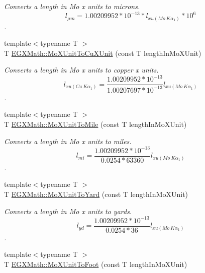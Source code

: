 \begin{DoxyCompactItemize}
\begin{DoxyCompactList}\small\item\em Converts a length in Mo x units to microns. \[ l_{\mu m}=1.00209952*10^{-13} * l_{xu(Mo\ K\alpha_1)} * 10^{6} \]. \end{DoxyCompactList}\item 
{\footnotesize template$<$typename T $>$ }\\T \mbox{\hyperlink{group___e_g_x_math-_conversions-_length_conversions-_non-_s_i-_mo_x_unit-_non-_s_i_ga15685a2e91cbe4f0ae403ed1b4c9b9b4}{E\+G\+X\+Math\+::\+Mo\+X\+Unit\+To\+Cu\+X\+Unit}} (const T length\+In\+Mo\+X\+Unit)
\begin{DoxyCompactList}\small\item\em Converts a length in Mo x units to copper x units. \[ l_{xu(Cu\ K\alpha_1)}= \frac{1.00209952*10^{-13}}{1.00207697*10^{-13}} l_{xu(Mo\ K\alpha_1)}\]. \end{DoxyCompactList}\item 
{\footnotesize template$<$typename T $>$ }\\T \mbox{\hyperlink{group___e_g_x_math-_conversions-_length_conversions-_non-_s_i-_mo_x_unit-_imperial_gabfdb228f43e8988c62daac3d6e71d7fa}{E\+G\+X\+Math\+::\+Mo\+X\+Unit\+To\+Mile}} (const T length\+In\+Mo\+X\+Unit)
\begin{DoxyCompactList}\small\item\em Converts a length in Mo x units to miles. \[ l_{mi}=\frac{1.00209952*10^{-13}}{0.0254 * 63360} l_{xu(Mo\ K\alpha_1)} \]. \end{DoxyCompactList}\item 
{\footnotesize template$<$typename T $>$ }\\T \mbox{\hyperlink{group___e_g_x_math-_conversions-_length_conversions-_non-_s_i-_mo_x_unit-_imperial_ga1b769f8b903e65e8d7027a9c427762ab}{E\+G\+X\+Math\+::\+Mo\+X\+Unit\+To\+Yard}} (const T length\+In\+Mo\+X\+Unit)
\begin{DoxyCompactList}\small\item\em Converts a length in Mo x units to yards. \[ l_{yd}= \frac{1.00209952*10^{-13}}{0.0254 * 36} l_{xu(Mo\ K\alpha_1)} \]. \end{DoxyCompactList}\item 
{\footnotesize template$<$typename T $>$ }\\T \mbox{\hyperlink{group___e_g_x_math-_conversions-_length_conversions-_non-_s_i-_mo_x_unit-_imperial_ga4ea603df9560a6bba1fc18f36becdf00}{E\+G\+X\+Math\+::\+Mo\+X\+Unit\+To\+Foot}} (const T length\+In\+Mo\+X\+Unit)

\end{DoxyCompactItemize}
